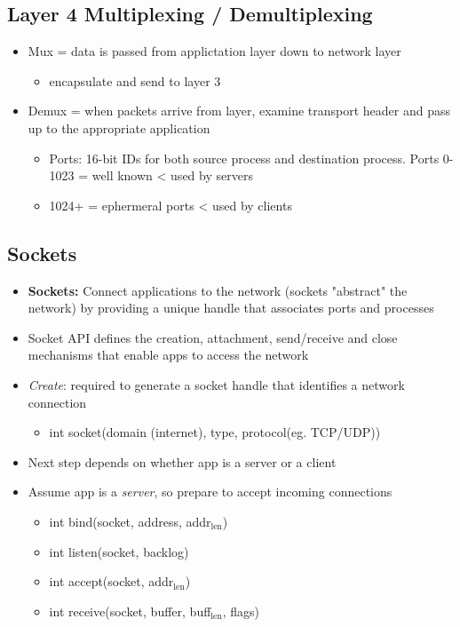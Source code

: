 \documentclass[11pt]{article}
\begin{document}
\subsection{Layer 4 Multiplexing / Demultiplexing}
\label{sec:orgheadline120}
\begin{itemize}
\item Mux = data is passed from applictation layer down to network layer
\begin{itemize}
\item encapsulate and send to layer 3
\end{itemize}
\item Demux = when packets arrive from layer, examine transport header and
pass up to the appropriate application
\begin{itemize}
\item Ports: 16-bit IDs for both source process and destination
process. Ports 0-1023 = well known < used by servers
\item 1024+ = ephermeral ports < used by clients
\end{itemize}
\end{itemize}

\subsection{Sockets}
\label{sec:orgheadline121}
\begin{itemize}
\item \textbf{Sockets:} Connect applications to the network (sockets "abstract"
the network) by providing a unique handle that associates ports and
processes
\item Socket API defines the creation, attachment, send/receive and close
mechanisms that enable apps to access the network

\item \emph{Create}: required to generate a socket handle that identifies a
network connection
\begin{itemize}
\item int socket(domain (internet), type, protocol(eg. TCP/UDP))
\end{itemize}
\item Next step depends on whether app is a server or a client
\item Assume app is a \emph{server}, so prepare to accept incoming connections
\begin{itemize}
\item int bind(socket, address, addr\(_{\text{len}}\))
\item int listen(socket, backlog)
\item int accept(socket, addr\(_{\text{len}}\))
\item int receive(socket, buffer, buff\(_{\text{len}}\), flags)
\end{itemize}
\end{itemize}
\end{document}
